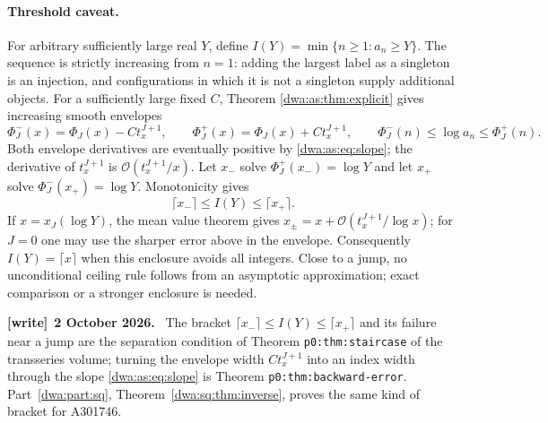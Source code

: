 \documentclass[11pt,letterpaper]{article}
\numberwithin{equation}{section}
\theoremstyle{remark}
\newcommand{\OO}{\mathcal O}
\newenvironment{writenote}[1][]{\par\smallskip\begingroup\small
 \noindent\textbf{[write]}\if\relax\detokenize{#1}\relax\else~\textbf{#1.}\fi\ }%
 {\par\endgroup\smallskip}
\begin{document}
\paragraph{Threshold caveat.}
For arbitrary sufficiently large real $Y$, define $I(Y)=\min\{n\ge1:a_n\ge Y\}$. The sequence is strictly increasing from $n=1$: adding the largest label as a singleton is an injection, and configurations in which it is not a singleton supply additional objects. For a sufficiently large fixed $C$, Theorem \ref{dwa:as:thm:explicit} gives increasing smooth envelopes
\[
 \Phi_J^-(x)=\Phi_J(x)-Ct_x^{J+1},\qquad
 \Phi_J^+(x)=\Phi_J(x)+Ct_x^{J+1},
 \qquad \Phi_J^-(n)\le\log a_n\le\Phi_J^+(n).
\]
Both envelope derivatives are eventually positive by \eqref{dwa:as:eq:slope}; the derivative of $t_x^{J+1}$ is $\OO(t_x^{J+1}/x)$. Let $x_-$ solve $\Phi_J^+(x_-)=\log Y$ and let $x_+$ solve $\Phi_J^-(x_+)=\log Y$. Monotonicity gives
\[
 \lceil x_-\rceil\le I(Y)\le\lceil x_+\rceil.
\]
If $x=x_J(\log Y)$, the mean value theorem gives $x_\pm=x+\OO(t_x^{J+1}/\log x)$; for $J=0$ one may use the sharper error above in the envelope. Consequently $I(Y)=\lceil x\rceil$ when this enclosure avoids all integers. Close to a jump, no unconditional ceiling rule follows from an asymptotic approximation; exact comparison or a stronger enclosure is needed.
\begin{writenote}[2 October 2026]
The bracket $\lceil x_-\rceil\le I(Y)\le\lceil x_+\rceil$ and its failure near a jump are the separation condition of Theorem \texttt{p0:thm:staircase} of the transseries volume; turning the envelope width $Ct_x^{J+1}$ into an index width through the slope \eqref{dwa:as:eq:slope} is Theorem \texttt{p0:thm:backward-error}. Part~\ref{dwa:part:sq}, Theorem~\ref{dwa:sq:thm:inverse}, proves the same kind of bracket for A301746.
\end{writenote}
\end{document}
